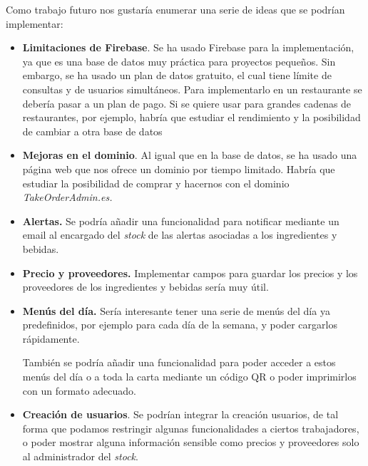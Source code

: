 Como trabajo futuro nos gustaría enumerar una serie de ideas que se podrían implementar:
\begin{itemize}

 \item \textbf{Limitaciones de Firebase}. Se ha usado Firebase para la implementación, ya que es una base de datos muy práctica para proyectos pequeños. 
Sin embargo, se ha usado un plan de datos gratuito, el cual tiene límite de consultas y de usuarios simultáneos. Para implementarlo en un restaurante se debería pasar a un plan de pago. Si se quiere usar para grandes cadenas de restaurantes, por ejemplo, habría que estudiar el rendimiento y la posibilidad de cambiar a otra base de datos

\item \textbf{Mejoras en el dominio}. Al igual que en la base de datos, se ha usado una página web que nos ofrece un dominio por tiempo limitado. Habría que estudiar la posibilidad de comprar y hacernos con el dominio \textit{TakeOrderAdmin.es.}

\item \textbf{Alertas.}
Se podría añadir una funcionalidad para notificar mediante un email al encargado del \textit{stock} de las alertas asociadas a los ingredientes y bebidas.

\item \textbf{Precio y proveedores.}
Implementar campos para guardar los precios y los proveedores de los ingredientes y bebidas sería muy útil.

\item \textbf{Menús del día.}
Sería interesante tener una serie de menús del día ya predefinidos, por ejemplo para cada día de la semana, y poder cargarlos rápidamente.

También se podría añadir una funcionalidad para poder acceder a estos menús del día o a toda la carta mediante un código QR o poder imprimirlos con un formato adecuado.

\item \textbf{Creación de usuarios}.
Se podrían integrar la creación usuarios, de tal forma que podamos restringir algunas funcionalidades a ciertos trabajadores, o poder mostrar alguna información sensible como precios y proveedores solo al administrador del \textit{stock}.
\end{itemize}

